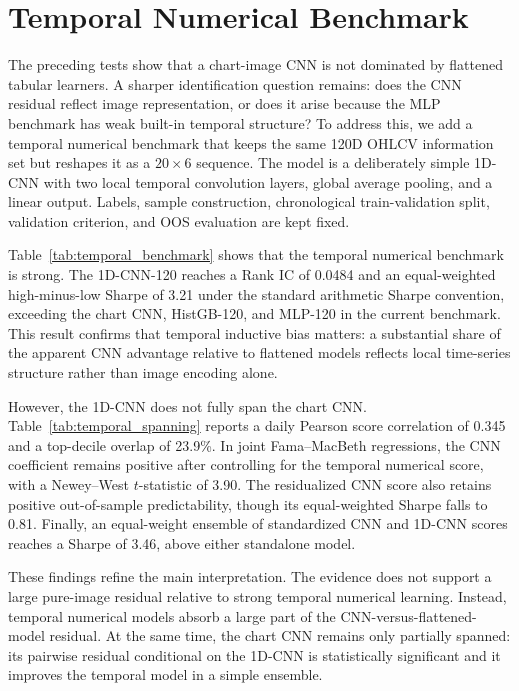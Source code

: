 \section{Temporal Numerical Benchmark}
\label{sec:temporal_benchmark}

The preceding tests show that a chart-image CNN is not dominated by flattened tabular learners. A sharper identification question remains: does the CNN residual reflect image representation, or does it arise because the MLP benchmark has weak built-in temporal structure? To address this, we add a temporal numerical benchmark that keeps the same 120D OHLCV information set but reshapes it as a $20\times 6$ sequence. The model is a deliberately simple 1D-CNN with two local temporal convolution layers, global average pooling, and a linear output. Labels, sample construction, chronological train-validation split, validation criterion, and OOS evaluation are kept fixed.



Table~\ref{tab:temporal_benchmark} shows that the temporal numerical benchmark is strong. The 1D-CNN-120 reaches a Rank IC of 0.0484 and an equal-weighted high-minus-low Sharpe of 3.21 under the standard arithmetic Sharpe convention, exceeding the chart CNN, HistGB-120, and MLP-120 in the current benchmark. This result confirms that temporal inductive bias matters: a substantial share of the apparent CNN advantage relative to flattened models reflects local time-series structure rather than image encoding alone.



However, the 1D-CNN does not fully span the chart CNN. Table~\ref{tab:temporal_spanning} reports a daily Pearson score correlation of 0.345 and a top-decile overlap of 23.9\%. In joint Fama--MacBeth regressions, the CNN coefficient remains positive after controlling for the temporal numerical score, with a Newey--West $t$-statistic of 3.90. The residualized CNN score also retains positive out-of-sample predictability, though its equal-weighted Sharpe falls to 0.81. Finally, an equal-weight ensemble of standardized CNN and 1D-CNN scores reaches a Sharpe of 3.46, above either standalone model.

These findings refine the main interpretation. The evidence does not support a large pure-image residual relative to strong temporal numerical learning. Instead, temporal numerical models absorb a large part of the CNN-versus-flattened-model residual. At the same time, the chart CNN remains only partially spanned: its pairwise residual conditional on the 1D-CNN is statistically significant and it improves the temporal model in a simple ensemble.
